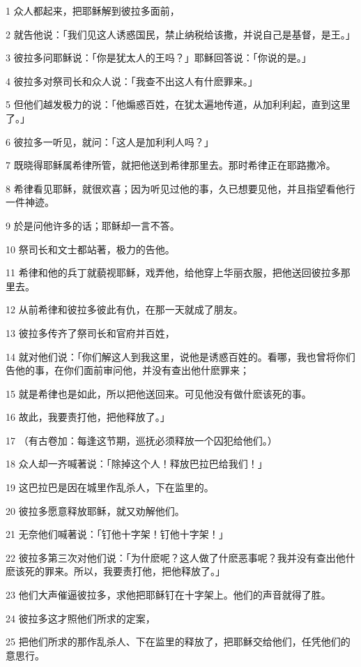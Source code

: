 \par 1 众人都起来，把耶稣解到彼拉多面前，
\par 2 就告他说：「我们见这人诱惑国民，禁止纳税给该撒，并说自己是基督，是王。」
\par 3 彼拉多问耶稣说：「你是犹太人的王吗？」耶稣回答说：「你说的是。」
\par 4 彼拉多对祭司长和众人说：「我查不出这人有什麽罪来。」
\par 5 但他们越发极力的说：「他煽惑百姓，在犹太遍地传道，从加利利起，直到这里了。」
\par 6 彼拉多一听见，就问：「这人是加利利人吗？」
\par 7 既晓得耶稣属希律所管，就把他送到希律那里去。那时希律正在耶路撒冷。
\par 8 希律看见耶稣，就很欢喜；因为听见过他的事，久已想要见他，并且指望看他行一件神迹。
\par 9 於是问他许多的话；耶稣却一言不答。
\par 10 祭司长和文士都站著，极力的告他。
\par 11 希律和他的兵丁就藐视耶稣，戏弄他，给他穿上华丽衣服，把他送回彼拉多那里去。
\par 12 从前希律和彼拉多彼此有仇，在那一天就成了朋友。
\par 13 彼拉多传齐了祭司长和官府并百姓，
\par 14 就对他们说：「你们解这人到我这里，说他是诱惑百姓的。看哪，我也曾将你们告他的事，在你们面前审问他，并没有查出他什麽罪来；
\par 15 就是希律也是如此，所以把他送回来。可见他没有做什麽该死的事。
\par 16 故此，我要责打他，把他释放了。」
\par 17 （有古卷加：每逢这节期，巡抚必须释放一个囚犯给他们。）
\par 18 众人却一齐喊著说：「除掉这个人！释放巴拉巴给我们！」
\par 19 这巴拉巴是因在城里作乱杀人，下在监里的。
\par 20 彼拉多愿意释放耶稣，就又劝解他们。
\par 21 无奈他们喊著说：「钉他十字架！钉他十字架！」
\par 22 彼拉多第三次对他们说：「为什麽呢？这人做了什麽恶事呢？我并没有查出他什麽该死的罪来。所以，我要责打他，把他释放了。」
\par 23 他们大声催逼彼拉多，求他把耶稣钉在十字架上。他们的声音就得了胜。
\par 24 彼拉多这才照他们所求的定案，
\par 25 把他们所求的那作乱杀人、下在监里的释放了，把耶稣交给他们，任凭他们的意思行。
